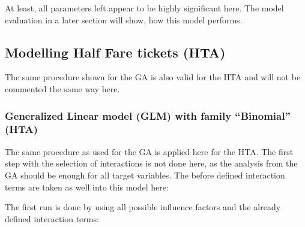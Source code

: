 \documentclass[
]{article}
\begin{document}
At least, all parameters left appear to be highly significant here. The
model evaluation in a later section will show, how this model performs.

\hypertarget{modelling-half-fare-tickets-hta}{%
\subsection{Modelling Half Fare tickets
(HTA)}\label{modelling-half-fare-tickets-hta}}

The same procedure shown for the GA is also valid for the HTA and will
not be commented the same way here.

\hypertarget{generalized-linear-model-glm-with-family-binomial-hta}{%
\subsubsection{Generalized Linear model (GLM) with family ``Binomial''
(HTA)}\label{generalized-linear-model-glm-with-family-binomial-hta}}

The same procedure as used for the GA is applied here for the HTA. The
first step with the selection of interactions is not done here, as the
analysis from the GA should be enough for all target variables. The
before defined interaction terms are taken as well into this model here:

The first run is done by using all possible influence factors and the
already defined interaction terms:
\end{document}
